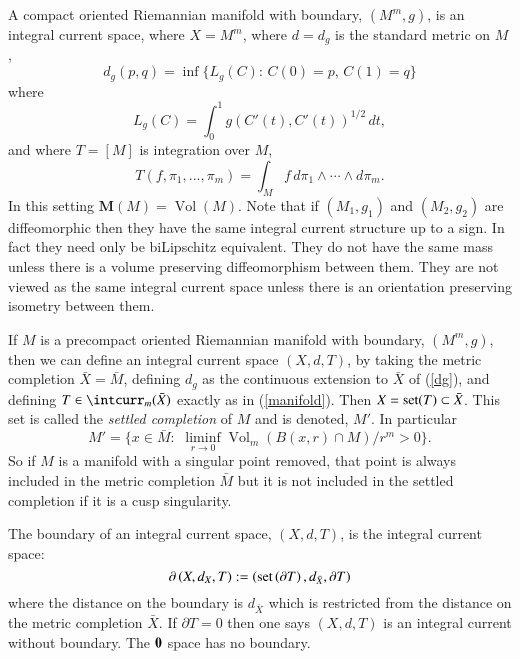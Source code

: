 \documentclass[12pt]{amsart}
\begin{document}
A compact oriented Riemannian manifold with boundary, $(M^m, g)$,
is an integral current space, where $X=M^m$, where $d=d_g$ is the standard
metric on $M$,
\begin{equation}\label{dg}
d_g(p,q) = \inf \{L_g(C):\, C(0)=p, \, C(1)=q\}
\end{equation}
where
\begin{equation}
 L_g(C)=\int_0^1 g(C'(t), C'(t))^{1/2} \, dt,
\end{equation}
and where $T=[M]$ is integration over $M$,
\begin{equation} \label{manifold}
T(f, \pi_1,...,\pi_m)= \int_M f\, d\pi_1 \wedge \cdots \wedge d\pi_m.
\end{equation}
In this setting ${{\mathbf M}}(M)={\operatorname{Vol}}(M)$.   Note that if $(M_1, g_1)$
and $(M_2, g_2)$ are diffeomorphic then they have the same integral
current structure up to a sign.  In fact they need only be biLipschitz equivalent.  They do not have the
same mass unless there is a volume preserving diffeomorphism
between them.  They are not viewed as the same integral current space unless there is an orientation preserving isometry between them.

If $M$ is a precompact oriented Riemannian manifold with boundary,
$(M^m, g)$, then we can define an integral current space $(X,d,T)$,
by taking the metric completion 
$\bar{X}=\bar{M}$, defining $d_g$ as the continuous
extension to $\bar{X}$ of (\ref{dg}), and defining $T \in \intcurr_m(\bar{X})$
exactly as in (\ref{manifold}).   Then $X={{\rm{set}}}(T) \subset \bar{X}$.
This set is called the {\em settled completion} of $M$ and is denoted, $M'$.
 In particular
 \begin{equation} \label{settled}
 M' = \{ x\in \bar{M}: \,\, \liminf_{r\to 0} {\operatorname{Vol}}_m(B(x,r)\cap M)/r^m >0 \}.
 \end{equation} 
 So if $M$ is a manifold with a singular point removed, that point is
 always included in the metric completion $\bar{M}$ but it is not included
 in the settled completion if it is a cusp singularity.

The boundary of an integral current space, $\left(X,d,T\right)$,
is the integral current space:
\begin{equation}
\partial \left(X,d_X,T\right) := \left({{\rm{set}}}\left(\partial T\right), d_{\bar{X}}, \partial T\right)
\end{equation}
where the distance on the boundary is $d_{\bar{X}}$ which is restricted
from the distance on the metric completion $\bar{X}$.
If $\partial T=0$ then one says $\left(X,d,T\right)$ is an integral current without boundary.  The ${\bf 0}$ space has no boundary.
\end{document}
